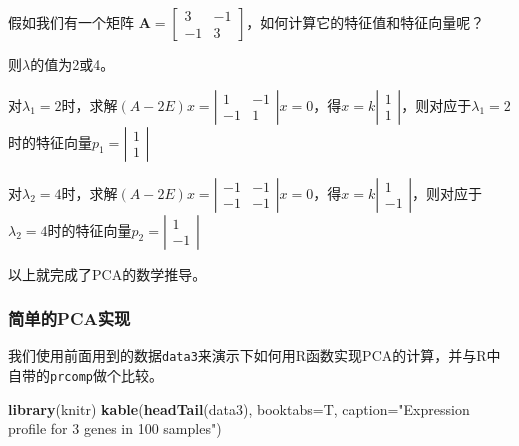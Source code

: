 \documentclass[]{article}
\newenvironment{Shaded}{\begin{snugshade}}{\end{snugshade}}
\newcommand{\KeywordTok}[1]{\textcolor[rgb]{0.13,0.29,0.53}{\textbf{{#1}}}}
\newcommand{\DataTypeTok}[1]{\textcolor[rgb]{0.13,0.29,0.53}{{#1}}}
\newcommand{\StringTok}[1]{\textcolor[rgb]{0.31,0.60,0.02}{{#1}}}
\newcommand{\NormalTok}[1]{{#1}}
\numberwithin{figure}{section}
\numberwithin{table}{section}
\theoremstyle{definition}
\theoremstyle{definition}
\theoremstyle{definition}
\theoremstyle{remark}
\begin{document}
假如我们有一个矩阵
\(\mathbf{A} = \left[\begin{array} {cc} 3 & -1 \\ -1 & 3 \end{array}\right]\)，如何计算它的特征值和特征向量呢？

则\(\lambda\)的值为2或4。

对\(\lambda_{1}=2\)时，求解\((A-2E)x=\left|\begin{array} {cc} 1 & -1 \\ -1 & 1 \end{array}\right| x= 0\)，得\(x=k\left|\begin{array}{c} 1 \\ 1 \end{array}\right|\)，则对应于\(\lambda_{1}=2\)时的特征向量\(p_{1}=\left|\begin{array}{c} 1 \\ 1 \end{array}\right|\)

对\(\lambda_{2}=4\)时，求解\((A-2E)x=\left|\begin{array} {cc} -1 & -1 \\ -1 & -1 \end{array}\right| x= 0\)，得\(x=k\left|\begin{array}{c} 1 \\ -1 \end{array}\right|\)，则对应于\(\lambda_{2}=4\)时的特征向量\(p_{2}=\left|\begin{array}{c} 1 \\ -1 \end{array}\right|\)

以上就完成了PCA的数学推导。

\subsubsection{简单的PCA实现}\label{pca}

我们使用前面用到的数据\texttt{data3}来演示下如何用R函数实现PCA的计算，并与R中自带的\texttt{prcomp}做个比较。

\begin{Shaded}
\begin{Highlighting}[]
\KeywordTok{library}\NormalTok{(knitr)}
\KeywordTok{kable}\NormalTok{(}\KeywordTok{headTail}\NormalTok{(data3), }\DataTypeTok{booktabs=}\NormalTok{T, }\DataTypeTok{caption=}\StringTok{"Expression profile for 3 genes in 100 samples"}\NormalTok{)}
\end{Highlighting}
\end{Shaded}
\end{document}
